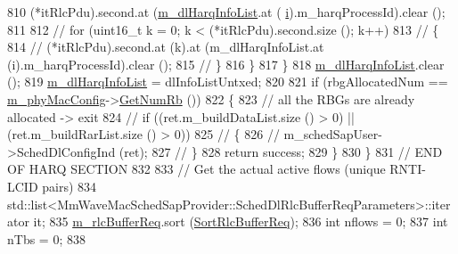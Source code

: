 \begin{DoxyCode}
{810                                 (*itRlcPdu).second.at (\hyperlink{classns3_1_1MmWaveRrMacScheduler_a1b1043d7f9994e2ee6a7e1b368e9d7a1}{m\_dlHarqInfoList}.at (
      \hyperlink{bernuolliDistribution_8m_a6f6ccfcf58b31cb6412107d9d5281426}{i}).m\_harqProcessId).clear ();
811 
812                                 \textcolor{comment}{//                              for (uint16\_t k = 0; k <
       (*itRlcPdu).second.size (); k++)}
813                                 \textcolor{comment}{//                              \{}
814                                 \textcolor{comment}{//                                      (*itRlcPdu).second.at (k).at
       (m\_dlHarqInfoList.at (i).m\_harqProcessId).clear ();}
815                                 \textcolor{comment}{//                              \}}
816                         \}
817                 \}
818                 \hyperlink{classns3_1_1MmWaveRrMacScheduler_a1b1043d7f9994e2ee6a7e1b368e9d7a1}{m\_dlHarqInfoList}.clear ();
819                 \hyperlink{classns3_1_1MmWaveRrMacScheduler_a1b1043d7f9994e2ee6a7e1b368e9d7a1}{m\_dlHarqInfoList} = dlInfoListUntxed;
820 
821                 \textcolor{keywordflow}{if} (rbgAllocatedNum == \hyperlink{classns3_1_1MmWaveMacScheduler_a24d7af4971d2e500fe543cefbafa2fd9}{m\_phyMacConfig}->\hyperlink{classns3_1_1MmWavePhyMacCommon_a4c5f323fd722d6eec52efda5d76f97ad}{GetNumRb} ())
822                 \{
823                         \textcolor{comment}{// all the RBGs are already allocated -> exit}
824                         \textcolor{comment}{//                      if ((ret.m\_buildDataList.size () > 0) ||
       (ret.m\_buildRarList.size () > 0))}
825                         \textcolor{comment}{//                      \{}
826                         \textcolor{comment}{//                              m\_schedSapUser->SchedDlConfigInd (ret);}
827                         \textcolor{comment}{//                      \}}
828                         \textcolor{keywordflow}{return} success;
829                 \}
830         \}
831         \textcolor{comment}{// END OF HARQ SECTION}
832 
833         \textcolor{comment}{// Get the actual active flows (unique RNTI-LCID pairs)}
834         std::list<MmWaveMacSchedSapProvider::SchedDlRlcBufferReqParameters>::iterator it;
835         \hyperlink{classns3_1_1MmWaveRrMacScheduler_a4808ca626b0b12682c3f1a079d016997}{m\_rlcBufferReq}.sort (\hyperlink{classns3_1_1MmWaveRrMacScheduler_ae0fee4909466a1900ad3d92b6b6fe3e2}{SortRlcBufferReq});
836         \textcolor{keywordtype}{int} nflows = 0;
837         \textcolor{keywordtype}{int} nTbs = 0;
838 
}
\end{DoxyCode}
